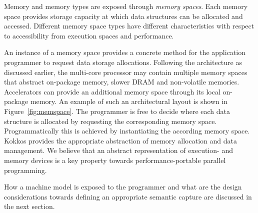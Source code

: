 Memory and memory types are exposed through \emph{memory spaces}. Each memory space provides storage capacity at which data structures can be allocated and accessed. Different memory space types have different characteristics with respect to accessibility from execution spaces and performance. 

An instance of a memory space provides a concrete method for the application programmer to request data storage allocations. Following the architecture as discussed earlier, the multi-core processor may contain multiple memory spaces that abstract on-package memory, slower DRAM and non-volatile memories. Accelerators can provide an additional memory space through its local on-package memory. An example of such an architectural layout is shown in Figure~\ref{fig:memspace}. The programmer is free to decide where each data structure is allocated by requesting the corresponding memory space. Programmatically this is achieved by instantiating the according memory space. Kokkos provides the appropriate abstraction of memory allocation and data management. We believe that an abstract representation of execution- and memory devices is a key property towards performance-portable parallel programming.

How a machine model is exposed to the programmer and what are the design considerations towards defining an appropriate semantic capture are discussed in the next section.



